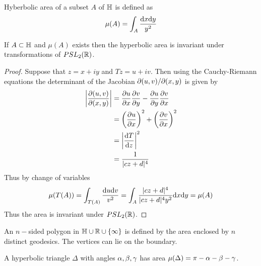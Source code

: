 \begin{definition}
  Hyberbolic area of a subset $A$ of $\mathbb{H}$ is defined as
  \begin{align*}
    \mu(A) = \int_A \frac{\dd x \dd y}{y^2}
  \end{align*}
\end{definition}
\begin{theorem}
  If $A\subset \mathbb{H}$ and $\mu(A)$ exists then the hyperbolic area is invariant under transformations of $PSL_2(\mathbb{R})$.
\end{theorem}
\begin{proof}
  Suppose that $z = x+iy$ and $Tz = u+iv$. Then using the Cauchy-Riemann equations the determinant of the Jacobian ${\partial} (u,v)/{\partial} (x,y)$ is given by
  \begin{align*}
    \abs{\frac{{\partial} (u,v)}{{\partial} (x,y)}} &= \pdv{u}{x}\pdv{v}{y} - \pdv{u}{y}\pdv{v}{x}\\
                                   &= \left(\pdv{u}{x}\right)^2 + \left(\pdv{v}{x}\right)^2\\
                                   &= \abs{\dv{T}{z}}^2\\
                                   &= \frac{1}{|cz+d|^4}
  \end{align*}
  Thus by change of variables
  \begin{align*}
    \mu(T(A)) = \int_{T(A)} \frac{\dd u \dd v}{v^2} = \int_{A}  \frac{|cz+d|^4}{|cz+d|^4 y^2} \dd x \dd y  = \mu(A)
  \end{align*}
  Thus the area is invariant under $PSL_2(\mathbb{R})$.
\end{proof}
\begin{definition}
  An $n-$sided polygon in $\mathbb{H}\cup\mathbb{R}\cup\{\infty\}$ is defined by the area enclosed by $n$ distinct geodesics. The vertices can lie on the boundary.
\end{definition}
\begin{theorem}
  A hyperbolic triangle $\Delta$ with angles $\alpha, \beta, \gamma$ has area $\mu(\Delta) = \pi - \alpha - \beta -\gamma$.
\end{theorem}
